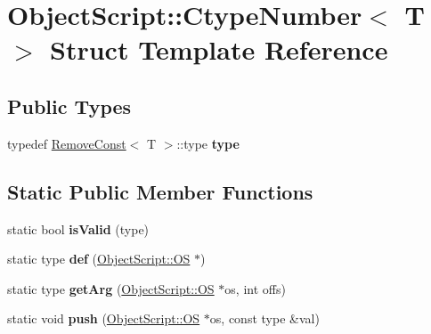 \hypertarget{struct_object_script_1_1_ctype_number}{}\section{Object\+Script\+:\+:Ctype\+Number$<$ T $>$ Struct Template Reference}
\label{struct_object_script_1_1_ctype_number}
\subsection*{Public Types}
\begin{DoxyCompactItemize}
\item 
typedef \hyperlink{struct_object_script_1_1_remove_const}{Remove\+Const}$<$ T $>$\+::type {\bfseries type}\hypertarget{struct_object_script_1_1_ctype_number_a5a7d1ed541fb404d9f09d03c578c1d65}{}\label{struct_object_script_1_1_ctype_number_a5a7d1ed541fb404d9f09d03c578c1d65}

\end{DoxyCompactItemize}
\subsection*{Static Public Member Functions}
\begin{DoxyCompactItemize}
\item 
static bool {\bfseries is\+Valid} (type)\hypertarget{struct_object_script_1_1_ctype_number_a5677de5f111cbfdc2d827caa13e36498}{}\label{struct_object_script_1_1_ctype_number_a5677de5f111cbfdc2d827caa13e36498}

\item 
static type {\bfseries def} (\hyperlink{class_object_script_1_1_o_s}{Object\+Script\+::\+OS} $\ast$)\hypertarget{struct_object_script_1_1_ctype_number_a5c07dfc07e50511ab37348c632e011af}{}\label{struct_object_script_1_1_ctype_number_a5c07dfc07e50511ab37348c632e011af}

\item 
static type {\bfseries get\+Arg} (\hyperlink{class_object_script_1_1_o_s}{Object\+Script\+::\+OS} $\ast$os, int offs)\hypertarget{struct_object_script_1_1_ctype_number_a5e3752fa600d68ddeae2fd3a2288338f}{}\label{struct_object_script_1_1_ctype_number_a5e3752fa600d68ddeae2fd3a2288338f}

\item 
static void {\bfseries push} (\hyperlink{class_object_script_1_1_o_s}{Object\+Script\+::\+OS} $\ast$os, const type \&val)\hypertarget{struct_object_script_1_1_ctype_number_a2be6350d7053151c824459fb35fb4435}{}\label{struct_object_script_1_1_ctype_number_a2be6350d7053151c824459fb35fb4435}

\end{DoxyCompactItemize}


